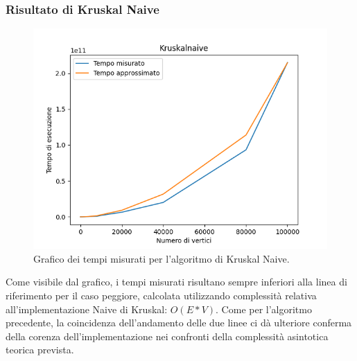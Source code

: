 \subsubsection{Risultato di Kruskal Naive}
\begin{figure}[H]
	\centering
	\includegraphics[width=1\linewidth]{"../graphs/Kruskal Naive"}
	\caption{Grafico dei tempi misurati per l'algoritmo di Kruskal Naive.}
	\label{fig:kruskal-graph}
\end{figure}
Come visibile dal grafico, i tempi misurati risultano sempre inferiori alla linea di riferimento per il caso peggiore, calcolata utilizzando complessità relativa all'implementazione Naive di Kruskal: $O(E*V)$. Come per l'algoritmo precedente, la coincidenza dell'andamento delle due linee ci dà ulteriore conferma della corenza dell'implementazione nei confronti della complessità asintotica teorica prevista.

\pagebreak

